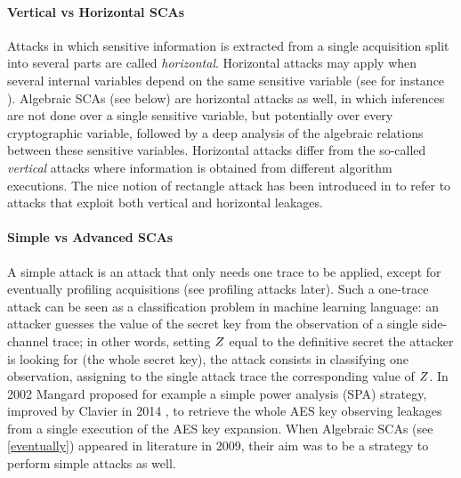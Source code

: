 \paragraph*{Vertical vs Horizontal SCAs}
Attacks in which sensitive information
is extracted from a single acquisition split into several parts are called \emph{horizontal}. Horizontal attacks may apply when several internal variables depend on the same sensitive variable (see for instance \cite{battistello2016horizontal}). Algebraic SCAs (see below) are horizontal attacks as well, in which inferences are not done over a single sensitive variable, but potentially over every cryptographic variable, followed by a deep analysis of the algebraic relations between these sensitive variables. Horizontal attacks differ from the so-called \emph{vertical} attacks where information is obtained from different algorithm executions. The nice notion of rectangle attack has been introduced in \cite{bauer2013horizontal} to refer to attacks that exploit both vertical and horizontal leakages.


\paragraph*{Simple vs Advanced SCAs}
A simple attack is an attack that only needs one trace to be applied,  except for eventually profiling acquisitions (see profiling attacks later). Such a one-trace attack can be seen as a classification problem in machine learning language: an attacker guesses the value of the secret key from the observation of a single side-channel trace;  in other words, setting $Z$ equal to the definitive secret the attacker is looking for (\eg the whole secret key), the attack consists in classifying one observation, \ie assigning to the single attack trace the corresponding value of $Z$. In 2002 Mangard \etal  \cite{mangard2002simple} proposed for example a simple power analysis (SPA) strategy, improved by Clavier \etal in 2014 \cite{clavier2014simple}, to retrieve the whole AES key observing leakages from a single execution of the AES key expansion. When Algebraic SCAs (see \ref{eventually}) appeared in literature in 2009, their aim was to be a strategy to perform simple attacks as well.  

